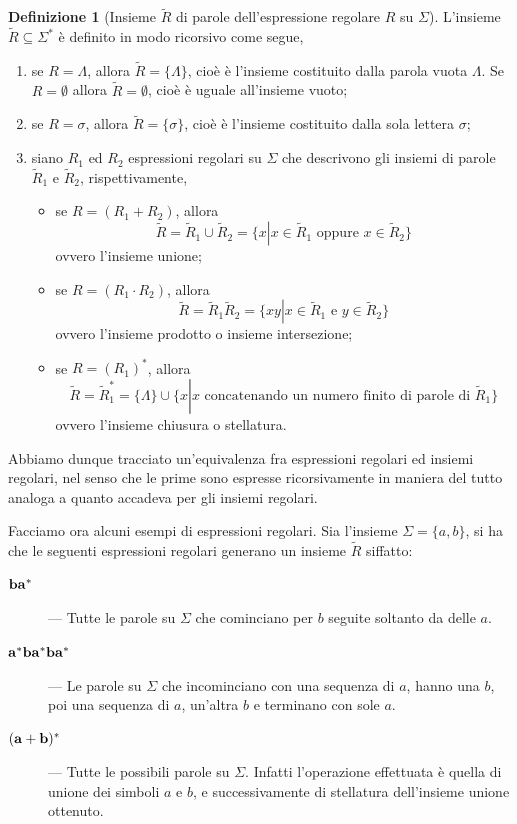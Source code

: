 \documentclass[10pt]{\classname}
\theoremstyle{newlinethm}
\theoremstyle{theorem}
\theoremstyle{definition}
\newtheorem{definizione}{Definizione}[section]
\theoremstyle{definition}
\theoremstyle{definition}
\theoremstyle{definition}
\begin{document}
\begin{definizione}[Insieme $\tilde R$ di parole dell'espressione regolare $R$ su $\Sigma$]
L'insieme $\tilde{R}\subseteq \Sigma^*$ è definito in modo ricorsivo come segue,
    \begin{enumerate}
        \item se $R = \Lambda$, allora $\tilde R = \{\Lambda\}$, cioè è l'insieme costituito dalla parola vuota $\Lambda$. Se $R = \emptyset$ allora $\tilde R = \emptyset$, cioè è uguale all'insieme vuoto;
        \item se $R = \sigma$, allora $\tilde R = \{ \sigma \}$, cioè è l'insieme costituito dalla sola lettera $\sigma$;
        \item siano $R_1$ ed $R_2$ espressioni regolari su $\Sigma$ che descrivono gli insiemi di parole $\tilde R_1$ e $\tilde R_2$, rispettivamente,
        \begin{itemize}
        \item se $R = (R_1 + R_2)$, allora \[\tilde R = \tilde R_1 \cup \tilde R_2 = \{x \left|\right. x \in \tilde R_1 \mbox{ oppure } x \in \tilde R_2\}\] ovvero l'insieme unione;
        \item se $R = (R_1 \cdot R_2)$, allora \[\tilde R = \tilde R_1 \tilde R_2 = \{xy \left|\right. x \in \tilde R_1 \mbox{ e } y \in \tilde R_2\}\] ovvero l'insieme prodotto o insieme intersezione;
        \item se $R = (R_1)^*$, allora \[\tilde R = \tilde R_1^* = \{\Lambda\} \cup \{x \left|\right. x \mbox{ concatenando un numero finito di parole di } \tilde R_1\}\] ovvero l'insieme chiusura o stellatura.
        \end{itemize}
    \end{enumerate}
\end{definizione}

Abbiamo dunque tracciato un'equivalenza fra espressioni regolari ed insiemi regolari, nel senso che le prime sono espresse ricorsivamente in maniera del tutto analoga a quanto accadeva per gli insiemi regolari.

Facciamo ora alcuni esempi di espressioni regolari. Sia l'insieme $\Sigma = \{a,b\}$, si ha che le seguenti espressioni regolari generano un insieme $\tilde R$ siffatto:
\begin{description}
    \item[$\bf ba^*$] --- Tutte le parole su $\Sigma$ che cominciano per $b$ seguite
        soltanto da delle $a$.
    \item[$\bf a^*ba^*ba^*$] --- Le parole su $\Sigma$ che incominciano con una sequenza di $a$,
        hanno una $b$, poi una sequenza di $a$, un'altra $b$ e terminano con
        sole $a$.
    \item[$\bf (a+b)^*$] --- Tutte le possibili parole su $\Sigma$. Infatti l'operazione effettuata è quella di unione dei simboli $a$ e $b$, e successivamente di stellatura dell'insieme unione ottenuto.
\end{description}
\end{document}
